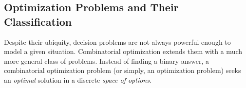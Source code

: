 \subsection{Optimization Problems and Their Classification}

Despite their ubiquity, decision problems are not always powerful enough to model a given situation. Combinatorial optimization extends them with a much more general class of problems. Instead of finding a binary answer, a combinatorial optimization problem (or simply, an optimization problem) seeks an \emph{optimal} solution in a discrete \emph{space of options}.


